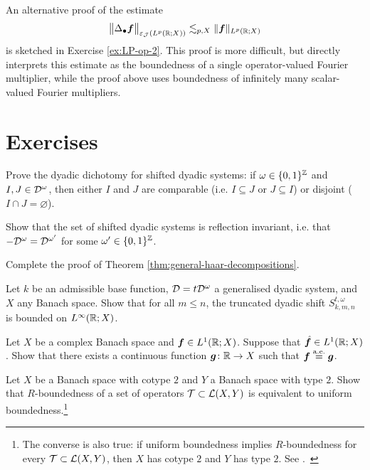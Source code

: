 An alternative proof of the estimate
\begin{equation*}
  \big\| \Delta_{\bullet} \bm{f} \big\|_{\varepsilon_{\mathcal{J}}(L^p(\mathbb{R};X))} \lesssim_{p,X} \|\bm{f}\|_{L^p(\mathbb{R};X)}
\end{equation*}
is sketched in Exercise \ref{ex:LP-op-2}.
This proof is more difficult, but directly interprets this estimate as the boundedness of a single operator-valued Fourier multiplier, while the proof above uses boundedness of infinitely many scalar-valued Fourier multipliers.

\section*{Exercises}

\begin{exercise}\label{ex:dyadic-dichotomy}
  Prove the dyadic dichotomy for shifted dyadic systems: if $\omega \in \{0,1\}^{\mathbb{Z}}$ and $I,J \in \mathcal{D}^{\omega}$, then either $I$ and $J$ are comparable (i.e. $I \subseteq J$ or $J \subseteq I$) or disjoint ($I \cap J = \varnothing$).
\end{exercise}

\begin{exercise}\label{ex:dyadic-refln-invariance}
  Show that the set of shifted dyadic systems is reflection invariant, i.e. that $-\mathcal{D}^{\omega} = \mathcal{D}^{\omega'}$ for some $\omega' \in \{0,1\}^{\mathbb{Z}}$.
\end{exercise}

\begin{exercise}\label{ex:mgale-reduction}
  Complete the proof of Theorem \ref{thm:general-haar-decompositions}.
\end{exercise}

\begin{exercise}
  Let $k$ be an admissible base function, $\mathcal{D} = t\mathcal{D}^{\omega}$ a generalised dyadic system, and $X$ any Banach space.
  Show that for all $m \leq n$, the truncated dyadic shift $S_{k,m,n}^{t,\omega}$ is bounded on $L^\infty(\mathbb{R};X)$.
\end{exercise}

\begin{exercise}
  Let $X$ be a complex Banach space and $\bm{f} \in L^1(\mathbb{R};X)$.
  Suppose that $\hat{\bm{f}} \in L^1(\mathbb{R};X)$.
  Show that there exists a continuous function $\bm{g} \colon \mathbb{R} \to X$ such that $\bm{f} \stackrel{\mathrm{a.e.}}{=} \bm{g}$.
\end{exercise}

\begin{exercise}\label{ex:R-bound-type}
  Let $X$ be a Banach space with cotype $2$ and $Y$ a Banach space with type $2$.
  Show that $R$-boundedness of a set of operators $\mathcal{T} \subset \mathcal{L}(X,Y)$ is equivalent to uniform boundedness.\footnote{The converse is also true: if uniform boundedness implies $R$-boundedness for every $\mathcal{T} \subset \mathcal{L}(X,Y)$, then $X$ has cotype $2$ and $Y$ has type $2$. See \cite[Proposition 8.6.1]{HNVW17}.\ }
\end{exercise}

